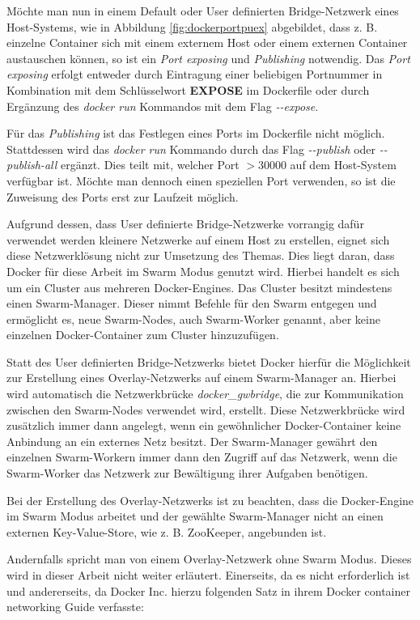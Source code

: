 Möchte man nun in einem Default oder User definierten Bridge-Netzwerk eines Host-Systems, wie in Abbildung \ref{fig:dockerportpuex} abgebildet, dass z. B. einzelne Container sich mit einem externem Host oder einem externen Container austauschen können, so ist ein \textit{Port exposing} und \textit{Publishing} notwendig.
Das \textit{Port exposing} erfolgt entweder durch Eintragung einer beliebigen Portnummer in Kombination mit dem Schlüsselwort \textbf{EXPOSE} im Dockerfile oder durch Ergänzung des \textit{docker run} Kommandos mit dem Flag \textit{{-}{-}expose}.

Für das \textit{Publishing} ist das Festlegen eines Ports im Dockerfile nicht möglich.
Stattdessen wird das \textit{docker run} Kommando durch das Flag \textit{{-}{-}publish} oder \textit{{-}{-}publish-all} ergänzt.
Dies teilt mit, welcher Port $>30000$ auf dem Host-System verfügbar ist.
Möchte man dennoch einen speziellen Port verwenden, so ist die Zuweisung des Ports erst zur Laufzeit möglich.

Aufgrund dessen, dass User definierte Bridge-Netzwerke vorrangig dafür verwendet werden kleinere Netzwerke auf einem Host zu erstellen, eignet sich diese Netzwerklösung nicht zur Umsetzung des Themas.
Dies liegt daran, dass Docker für diese Arbeit im Swarm Modus genutzt wird.
Hierbei handelt es sich um ein Cluster aus mehreren Docker-Engines.
Das Cluster besitzt mindestens einen Swarm-Manager.
Dieser nimmt Befehle für den Swarm entgegen und ermöglicht es, neue Swarm-Nodes, auch Swarm-Worker genannt, aber keine einzelnen Docker-Container zum Cluster hinzuzufügen.

Statt des User definierten Bridge-Netzwerks bietet Docker hierfür die Möglichkeit zur Erstellung eines Overlay-Netzwerks auf einem Swarm-Manager an.
Hierbei wird automatisch die Netzwerkbrücke \textit{docker\_gwbridge}, die zur Kommunikation zwischen den Swarm-Nodes verwendet wird, erstellt.
Diese Netzwerkbrücke wird zusätzlich immer dann angelegt, wenn ein gewöhnlicher Docker-Container keine Anbindung an ein externes Netz besitzt.
Der Swarm-Manager gewährt den einzelnen Swarm-Workern immer dann den Zugriff auf das Netzwerk, wenn die Swarm-Worker das Netzwerk zur Bewältigung ihrer Aufgaben benötigen. 

Bei der Erstellung des Overlay-Netzwerks ist zu beachten, dass die Docker-Engine im Swarm Modus arbeitet und der gewählte Swarm-Manager nicht an einen externen Key-Value-Store, wie z. B. ZooKeeper, angebunden ist.

Andernfalls spricht man von einem Overlay-Netzwerk ohne Swarm Modus.
Dieses wird in dieser Arbeit nicht weiter erläutert.
Einerseits, da es nicht erforderlich ist und andererseits, da Docker Inc. hierzu folgenden Satz in ihrem \glqq{}Docker container networking Guide\grqq{} verfasste:

